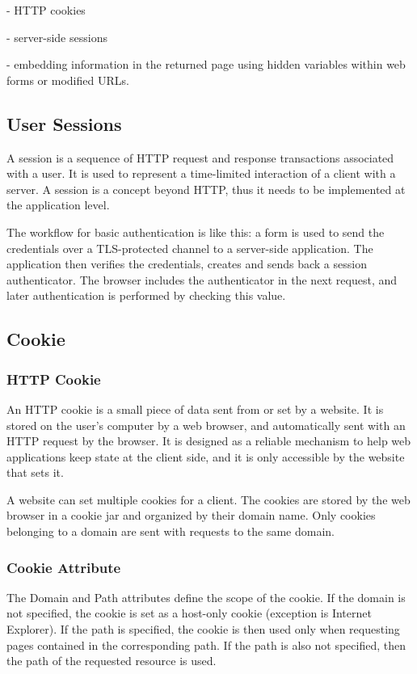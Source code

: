 - HTTP cookies

- server-side sessions

- embedding information in the returned page using hidden variables within web forms or modified URLs. 

\subsection{User Sessions}
A session is a sequence of HTTP request and response transactions associated with a user. It is used to represent a time-limited interaction of a client with a server. A session is a concept beyond HTTP, thus it needs to be implemented at the application level. 

The workflow for basic authentication is like this: a form is used to send the credentials over a TLS-protected channel to a server-side application. The application then verifies the credentials, creates and sends back a session authenticator. The browser includes the authenticator in the next request, and later authentication is performed by checking this value. 

\subsection{Cookie}
\subsubsection{HTTP Cookie}
An HTTP cookie is a small piece of data sent from or set by a website. It is stored on the user's computer by a web browser, and automatically sent with an HTTP request by the browser. It is designed as a reliable mechanism to help web applications keep state at the client side, and it is only accessible by the website that sets it. 

A website can set multiple cookies for a client. The cookies are stored by the web browser in a cookie jar and organized by their domain name. Only cookies belonging to a domain are sent with requests to the same domain. 

\subsubsection{Cookie Attribute}
The Domain and Path attributes define the scope of the cookie. If the domain is not specified, the cookie is set as a host-only cookie (exception is Internet Explorer). If the path is specified, the cookie is then used only when requesting pages contained in the corresponding path. If the path is also not specified, then the path of the requested resource is used. 

